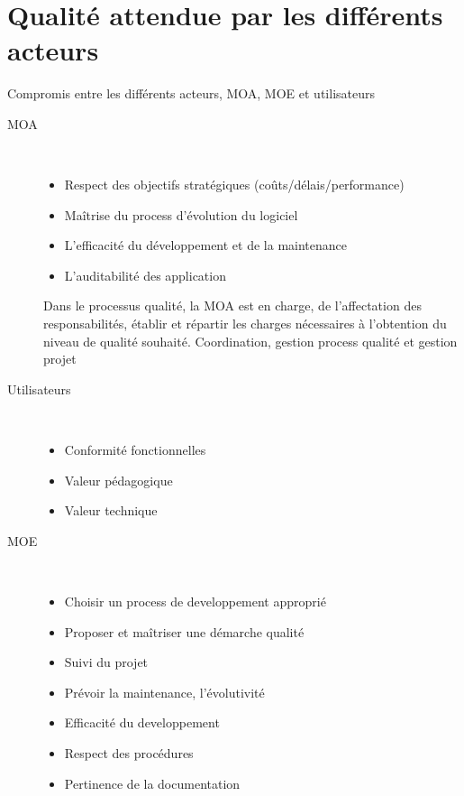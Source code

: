 \section{Qualité attendue par les différents acteurs}

Compromis entre les différents acteurs, MOA, MOE et utilisateurs

\begin{description}

    \item[MOA]\hfill\\
		\begin{itemize}
		\item Respect des objectifs stratégiques (coûts/délais/performance)
		\item Maîtrise du process d’évolution du logiciel
		\item L’efficacité du développement et de la maintenance
		\item L’auditabilité des application
		\end{itemize}

		Dans le processus qualité, la MOA est en charge, de l’affectation des responsabilités, établir et répartir les charges nécessaires à l’obtention du niveau de qualité souhaité.
		Coordination, gestion process qualité et gestion projet

	\item[Utilisateurs]\hfill\\
		\begin{itemize}
		\item Conformité fonctionnelles
		\item Valeur pédagogique
		\item Valeur technique
		\end{itemize}

	\item[MOE]\hfill\\
		\begin{itemize}
		\item Choisir un process de developpement approprié
		\item Proposer et maîtriser une démarche qualité
		\item Suivi du projet
		\item Prévoir la maintenance, l’évolutivité
		\item Efficacité du developpement
		\item Respect des procédures
		\item Pertinence de la documentation
		\end{itemize}
		
\end{description}




